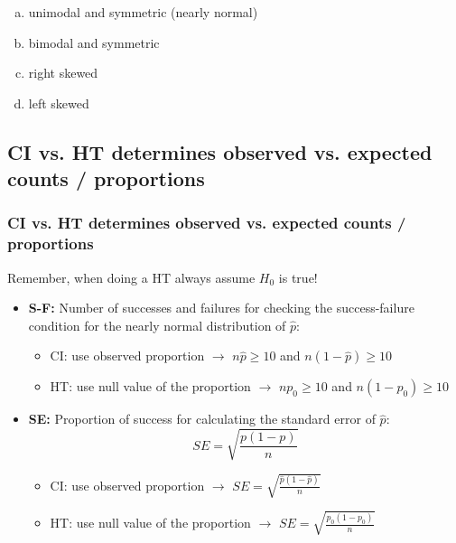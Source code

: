 \documentclass[11pt,containsverbatim,handout,xcolor=xelatex,dvipsnames,table]{beamer}
\newcommand{\solnMult}[1]{#1}
\begin{document}

\begin{frame}
\frametitle{}


\begin{enumerate}[(a)]
\item \solnMult{unimodal and symmetric (nearly normal)}
\item bimodal and symmetric
\item right skewed
\item left skewed
\end{enumerate}

\end{frame}


\subsection{CI vs. HT determines observed vs. expected counts / proportions}
\label{mi3}


\begin{frame}
\frametitle{CI vs. HT determines observed vs. expected counts / proportions}

Remember, when doing a HT always assume $H_0$ is true!
\pause

\begin{itemize}

\item \textbf{S-F:} Number of successes and failures for checking the success-failure condition for the nearly normal distribution of $\hat{p}$:
\pause
\begin{itemize}
\item CI: use observed proportion $\rightarrow$ $n\hat{p} \ge 10$ and $n(1 - \hat{p}) \ge 10$
\pause
\item HT: use null value of the proportion $\rightarrow$ $np_0 \ge 10$ and $n(1 - p_0) \ge 10$
\end{itemize}

\pause

\item \textbf{SE:} Proportion of success for calculating the standard error of $\hat{p}$: 
\[ SE = \sqrt{\frac{p(1-p)}{n}} \]
\pause
\vspace{-0.5cm}
\begin{itemize}
\item CI: use observed proportion $\rightarrow$ $SE = \sqrt{\frac{\hat{p}(1-\hat{p})}{n}}$
\pause
\item HT: use null value of the proportion $\rightarrow$ $SE = \sqrt{\frac{p_0(1-p_0)}{n}}$
\end{itemize}

\end{itemize}

\end{frame}
\end{document}
